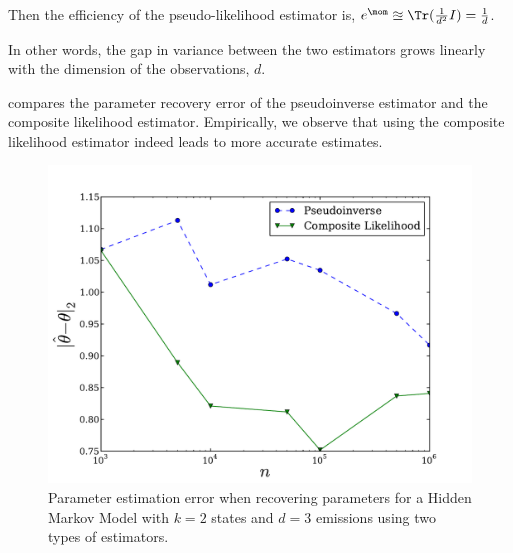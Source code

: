 Then the efficiency of the pseudo-likelihood estimator is,
$e^\mom \approxeq \Tr(\frac{1}{d^2} I) = \frac{1}{d}$.

In other words, the gap in variance between the two estimators
grows linearly with the dimension of the observations, $d$.

 compares the parameter recovery error of the
  pseudoinverse estimator and the composite likelihood estimator.
Empirically, we observe that using the composite likelihood estimator
indeed leads to more accurate estimates.


\begin{figure}
  \centering
  \includegraphics[width=0.8\columnwidth]{figures/hmm-2-3.pdf}
  \caption{Parameter estimation error when recovering parameters for a Hidden
  Markov Model with $k=2$ states and $d=3$ emissions using two types of estimators.}
    \label{fig:cl-hmm}
\end{figure}
